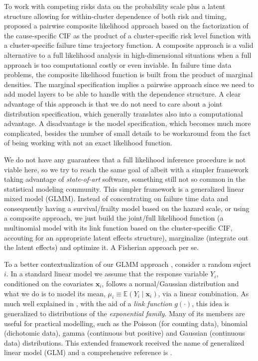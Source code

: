 To work with competing risks data on the probability scale plus a latent
structure allowing for within-cluster dependence of both risk and
timing,  proposed a pairwise composite likelihood
approach based on the factorization of the cause-specific CIF as the
product of a cluster-specific risk level function with a
cluster-specific failure time trajectory function. A composite approach
\cite{lindsay88, cox&reid04, varin11} is a valid alternative to a full
likelihood analysis in high-dimensional situations when a full approach
is too computational costly or even inviable. In failure time data
problems, the composite likelihood function is built from the product of
marginal densities. The marginal specification implies a pairwise
approach since we need to add model layers to be able to handle with the
dependence structure. A clear advantage of this approach is that we do
not need to care about a joint distribution specification, which
generally translates also into a computational advantage. A disadvantage
is the model specification, which becomes much more complicated, besides
the number of small details to be workaround from the fact of being
working with not an exact likelihood function.

We do not have any guarantees that a full likelihood inference procedure
is not viable here, so we try to reach the same goal of
 albeit with a simpler framework taking advantage of
\textit{state-of-art} software, something still not so common in the
statistical modeling community. This simpler framework is a generalized
linear mixed model (GLMM). Instead of concentrating on failure time data
and consequently having a survival/frailty model based on the hazard
scale, or using a composite approach, we just build the joint/full
likelihood function (a multinomial model with its link function based on
the cluster-specific CIF, accouting for an appropriate latent effects
structure), marginalize (integrate out the latent effects) and optimize
it. A Fisherian approach per se.

To a better contextualization of our GLMM approach \cite{GLMM}, consider
a random suject \(i\). In a standard linear model we assume that the
response variable \(Y_{i}\), conditioned on the covariates
\(\bm{x}_{i}\), follows a normal/Gaussian distribution and what we do is
to model its mean, \(\mu_{i} \equiv \mathbb{E}(Y_{i} \mid \bm{x}_{i})\),
via a linear combination. As much well explained in ,
with the aid of a \textit{link function} \(g(\cdot)\), this idea is
generalized to distributions of the \textit{exponential family}. Many of
its members are useful for practical modelling, such as the Poisson (for
counting data), binomial (dichotomic data), gamma (continuous but
positive) and Gaussian (continuous data) distributions. This extended
framework received the name of generalized linear model (GLM) and a
comprehensive reference is .

